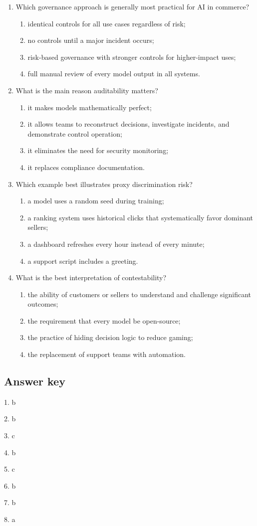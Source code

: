 \begin{enumerate}
  \item Which governance approach is generally most practical for AI in commerce?
  \begin{enumerate}
    \item identical controls for all use cases regardless of risk;
    \item no controls until a major incident occurs;
    \item risk-based governance with stronger controls for higher-impact uses;
    \item full manual review of every model output in all systems.
  \end{enumerate}

  \item What is the main reason auditability matters?
  \begin{enumerate}
    \item it makes models mathematically perfect;
    \item it allows teams to reconstruct decisions, investigate incidents, and demonstrate control operation;
    \item it eliminates the need for security monitoring;
    \item it replaces compliance documentation.
  \end{enumerate}

  \item Which example best illustrates proxy discrimination risk?
  \begin{enumerate}
    \item a model uses a random seed during training;
    \item a ranking system uses historical clicks that systematically favor dominant sellers;
    \item a dashboard refreshes every hour instead of every minute;
    \item a support script includes a greeting.
  \end{enumerate}

  \item What is the best interpretation of contestability?
  \begin{enumerate}
    \item the ability of customers or sellers to understand and challenge significant outcomes;
    \item the requirement that every model be open-source;
    \item the practice of hiding decision logic to reduce gaming;
    \item the replacement of support teams with automation.
  \end{enumerate}
\end{enumerate}

\subsection*{Answer key}
1. b

2. b

3. c

4. b

5. c

6. b

7. b

8. a
